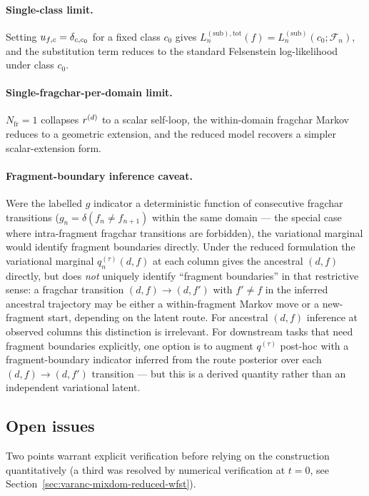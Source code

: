 \paragraph{Single-class limit.}
Setting $u_{f, c} = \delta_{c, c_0}$ for a fixed class $c_0$
gives $L^{(\text{sub}), \text{tot}}_n(f) = L^{(\text{sub})}_n(c_0;
\mathcal{F}_n)$, and the substitution term reduces to the standard
Felsenstein log-likelihood under class $c_0$.

\paragraph{Single-fragchar-per-domain limit.}
$N_{\text{fr}} = 1$ collapses $r^{(d)}$ to a scalar self-loop, the
within-domain fragchar Markov reduces to a geometric extension, and
the reduced model recovers a simpler scalar-extension form.

\paragraph{Fragment-boundary inference caveat.}
Were the labelled $g$ indicator a deterministic function of
consecutive fragchar transitions ($g_n = \delta(f_n \neq f_{n+1})$
within the same domain --- the special case where intra-fragment
fragchar transitions are forbidden), the variational marginal would
identify fragment boundaries directly. Under the reduced formulation
the variational marginal $q_n^{(\tau)}(d, f)$ at each column gives
the ancestral $(d, f)$ directly, but does \emph{not} uniquely identify
``fragment boundaries'' in that restrictive sense: a fragchar
transition $(d, f) \to (d, f')$ with $f' \neq f$ in the inferred
ancestral trajectory may be either a within-fragment Markov move or
a new-fragment start, depending on the latent route. For ancestral
$(d, f)$
inference at observed columns this distinction is irrelevant. For
downstream tasks that need fragment boundaries explicitly, one
option is to augment $q^{(\tau)}$ post-hoc with a
fragment-boundary indicator inferred from the route posterior over
each $(d, f) \to (d, f')$ transition --- but this is a derived
quantity rather than an independent variational latent.

\subsection{Open issues}
\label{sec:varanc-mixdom-open-issues}

Two points warrant explicit verification before relying on the
construction quantitatively (a third was resolved by numerical
verification at $t=0$, see Section~\ref{sec:varanc-mixdom-reduced-wfst}).

